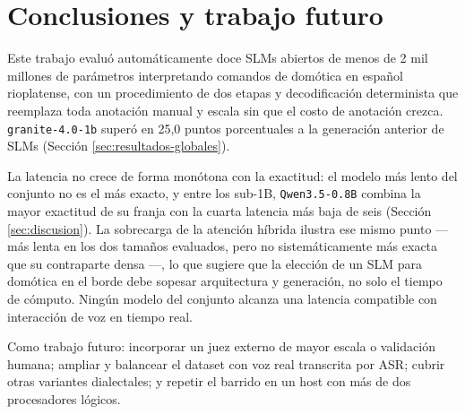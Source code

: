 \section{Conclusiones y trabajo futuro}

Este trabajo evaluó automáticamente doce SLMs abiertos de menos de 2 mil
millones de parámetros interpretando comandos de domótica en español
rioplatense, con un procedimiento de dos etapas y decodificación determinista
que reemplaza toda anotación manual y escala sin que el costo de anotación
crezca. \texttt{granite-4.0-1b} superó en 25,0 puntos porcentuales a la
generación anterior de SLMs (Sección \ref{sec:resultados-globales}).

La latencia no crece de forma monótona con la exactitud: el modelo más lento
del conjunto no es el más exacto, y entre los sub-1B, \texttt{Qwen3.5-0.8B}
combina la mayor exactitud de su franja con la cuarta latencia más baja de
seis (Sección \ref{sec:discusion}). La sobrecarga de la atención híbrida ilustra ese mismo punto
— más lenta en los dos tamaños evaluados, pero no sistemáticamente más exacta
que su contraparte densa —, lo que sugiere que la elección de un SLM para
domótica en el borde debe sopesar arquitectura y generación, no solo el
tiempo de cómputo. Ningún modelo del conjunto alcanza una latencia compatible
con interacción de voz en tiempo real.

Como trabajo futuro: incorporar un juez externo de mayor escala o validación
humana; ampliar y balancear el dataset con voz real transcrita por ASR;
cubrir otras variantes dialectales; y repetir el barrido en un host con más
de dos procesadores lógicos.
